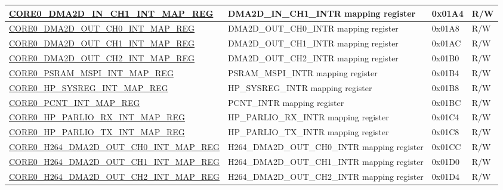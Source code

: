 \begin{longtable}{ | p{7.5cm} | p{7.2cm} | p{1.3cm} | p{1cm} | }
\hyperref[regdesc:CORE0DMA2DINCH1INTMAPREG]{CORE0\_DMA2D\_IN\_CH1\_INT\_MAP\_REG} & DMA2D\_IN\_CH1\_INTR mapping register & 0x01A4 & R/W \\ \hline

\hyperref[regdesc:CORE0DMA2DOUTCH0INTMAPREG]{CORE0\_DMA2D\_OUT\_CH0\_INT\_MAP\_REG} & DMA2D\_OUT\_CH0\_INTR mapping register & 0x01A8 & R/W \\ \hline

\hyperref[regdesc:CORE0DMA2DOUTCH1INTMAPREG]{CORE0\_DMA2D\_OUT\_CH1\_INT\_MAP\_REG} & DMA2D\_OUT\_CH1\_INTR mapping register & 0x01AC & R/W \\ \hline

\hyperref[regdesc:CORE0DMA2DOUTCH2INTMAPREG]{CORE0\_DMA2D\_OUT\_CH2\_INT\_MAP\_REG} & DMA2D\_OUT\_CH2\_INTR mapping register & 0x01B0 & R/W \\ \hline

\hyperref[regdesc:CORE0PSRAMMSPIINTMAPREG]{CORE0\_PSRAM\_MSPI\_INT\_MAP\_REG} & PSRAM\_MSPI\_INTR mapping register & 0x01B4 & R/W \\ \hline

\hyperref[regdesc:CORE0HPSYSREGINTMAPREG]{CORE0\_HP\_SYSREG\_INT\_MAP\_REG} & HP\_SYSREG\_INTR mapping register & 0x01B8 & R/W \\ \hline

\hyperref[regdesc:CORE0PCNTINTMAPREG]{CORE0\_PCNT\_INT\_MAP\_REG} & PCNT\_INTR mapping register & 0x01BC & R/W \\ \hline

\hyperref[regdesc:CORE0HPPARLIORXINTMAPREG]{CORE0\_HP\_PARLIO\_RX\_INT\_MAP\_REG} & HP\_PARLIO\_RX\_INTR mapping register & 0x01C4 & R/W \\ \hline

\hyperref[regdesc:CORE0HPPARLIOTXINTMAPREG]{CORE0\_HP\_PARLIO\_TX\_INT\_MAP\_REG} & HP\_PARLIO\_TX\_INTR mapping register & 0x01C8 & R/W \\ \hline

\hyperref[regdesc:CORE0H264DMA2DOUTCH0INTMAPREG]{CORE0\_H264\_DMA2D\_OUT\_CH0\_INT\_MAP\_REG} & H264\_DMA2D\_OUT\_CH0\_INTR mapping register & 0x01CC & R/W \\ \hline

\hyperref[regdesc:CORE0H264DMA2DOUTCH1INTMAPREG]{CORE0\_H264\_DMA2D\_OUT\_CH1\_INT\_MAP\_REG} & H264\_DMA2D\_OUT\_CH1\_INTR mapping register & 0x01D0 & R/W \\ \hline

\hyperref[regdesc:CORE0H264DMA2DOUTCH2INTMAPREG]{CORE0\_H264\_DMA2D\_OUT\_CH2\_INT\_MAP\_REG} & H264\_DMA2D\_OUT\_CH2\_INTR mapping register & 0x01D4 & R/W \\ \hline


\end{longtable}
